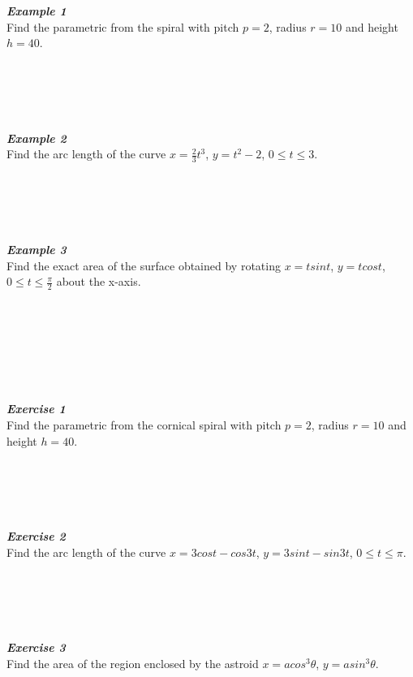 \documentclass[12px]{article}
\begin{document}
\begin{multicols}{2}
    \noindent\textbf{\textit{Example 1}}\\
    Find the parametric from the spiral with pitch $p=2$, radius $r=10$ and height $h=40$.\\
    \\
    \\
    \\
    \\
    \\
    \textbf{\textit{Example 2}}\\
    Find the arc length of the curve $x=\frac{2}{3}t^3$, $y=t^2-2$, $0\leq t\leq 3$.\\
    \\
    \\
    \\
    \\
    \\
    \textbf{\textit{Example 3}}\\
    Find the exact area of the surface obtained by rotating $x=tsint$, $y=tcost$, $0\leq t\leq \frac{\pi}{2}$ about the x-axis.\\
    \\
    \\
    \\
    \\
    \\
    \\
    \\
    \textbf{\textit{Exercise 1}}\\
    Find the parametric from the cornical spiral with pitch $p=2$, radius $r=10$ and height $h=40$.\\
    \\
    \\
    \\
    \\
    \\
    \textbf{\textit{Exercise 2}}\\
    Find the arc length of the curve $x=3cost-cos3t$, $y=3sint-sin3t$, $0\leq t\leq \pi$.\\
    \\
    \\
    \\
    \\
    \\
    \textbf{\textit{Exercise 3}}\\
    Find the area of the region enclosed by the astroid $x=acos^3\theta$, $y=asin^3\theta$.\\
    \\
    \\
    \\
    \\
    \\
    \\
\end{multicols}
\end{document}
